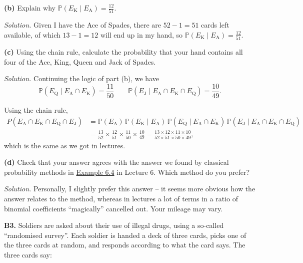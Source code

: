 \documentclass[
  a4paper,
]{book}
\theoremstyle{definition}
\theoremstyle{definition}
\theoremstyle{definition}
\theoremstyle{definition}
\theoremstyle{remark}
\begin{document}
\textbf{(b)} Explain why \(\mathbb P(E_\mathrm{K} \mid E_\mathrm{A}) = \frac{12}{51}\).

\begin{myanswers}
\emph{Solution.} Given I have the Ace of Spades, there are \(52 - 1 = 51\) cards left available, of which \(13 - 1 = 12\) will end up in my hand, so \(\mathbb P(E_\mathrm{K} \mid E_\mathrm{A}) = \frac{12}{51}\).

\end{myanswers}

\textbf{(c)} Using the chain rule, calculate the probability that your hand contains all four of the Ace, King, Queen and Jack of Spades.

\begin{myanswers}
\emph{Solution.} Continuing the logic of part (b), we have
\[ \mathbb P(E_\mathrm{Q} \mid E_\mathrm{A} \cap E_\mathrm{K}) = \frac{11}{50} \qquad \mathbb P(E_\mathrm{J} \mid E_\mathrm{A} \cap E_\mathrm{K} \cap E_\mathrm{Q}) = \frac{10}{49} . \]

Using the chain rule,
\begin{align*}
P( E_\mathrm{A} \cap E_\mathrm{K} \cap E_\mathrm{Q} \cap E_\mathrm{J} )
  &= \mathbb P(E_\mathrm{A}) \, \mathbb P(E_\mathrm{K} \mid E_\mathrm{A}) \, \mathbb P(E_\mathrm{Q} \mid E_\mathrm{A} \cap E_\mathrm{K}) \, \mathbb P(E_\mathrm{J} \mid E_\mathrm{A} \cap E_\mathrm{K} \cap E_\mathrm{Q}) \\
  &= \frac{13}{52} \times \frac{12}{51} \times \frac{11}{50} \times \frac{10}{49} = \frac{13 \times 12 \times 11 \times 10}{52 \times 51 \times 50 \times 49} , 
\end{align*}
which is the same as we got in lectures.

\end{myanswers}

\textbf{(d)} Check that your answer agrees with the answer we found by classical probability methods in \href{L06-classical-ii.html\#exm:akqj}{Example 6.4} in Lecture 6. Which method do you prefer?

\begin{myanswers}
\emph{Solution.} Personally, I slightly prefer this answer -- it seems more obvious how the answer relates to the method, whereas in lectures a lot of terms in a ratio of binomial coefficients ``magically'' cancelled out. Your mileage may vary.

\end{myanswers}

\textbf{B3.} Soldiers are asked about their use of illegal drugs, using a so-called ``randomised survey''. Each soldier is handed a deck of three cards, picks one of the three cards at random, and responds according to what the card says. The three cards say:
\end{document}
